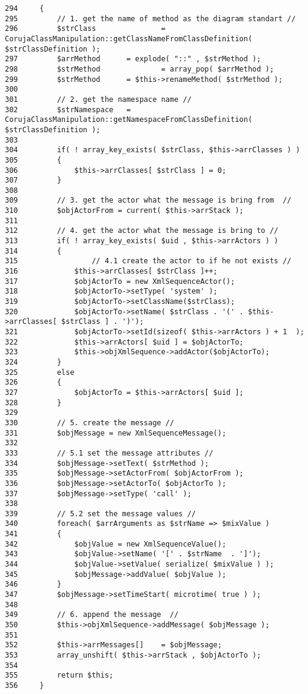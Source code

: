 \begin{Code}\begin{verbatim}294     {
295         // 1. get the name of method as the diagram standart //
296         $strClass               = CorujaClassManipulation::getClassNameFromClassDefinition( $strClassDefinition );
297         $arrMethod      = explode( "::" , $strMethod );
298         $strMethod              = array_pop( $arrMethod );
299         $strMethod      = $this->renameMethod( $strMethod );
300 
301         // 2. get the namespace name //
302         $strNamespace   = CorujaClassManipulation::getNamespaceFromClassDefinition( $strClassDefinition );
303 
304         if( ! array_key_exists( $strClass, $this->arrClasses ) )
305         {
306             $this->arrClasses[ $strClass ] = 0;
307         }
308 
309         // 3. get the actor what the message is bring from  //
310         $objActorFrom = current( $this->arrStack );
311 
312         // 4. get the actor what the message is bring to //
313         if( ! array_key_exists( $uid , $this->arrActors ) )
314         {
315                 // 4.1 create the actor to if he not exists //
316             $this->arrClasses[ $strClass ]++;
317             $objActorTo = new XmlSequenceActor();
318             $objActorTo->setType( 'system' );
319             $objActorTo->setClassName($strClass);
320             $objActorTo->setName( $strClass . '(' . $this->arrClasses[ $strClass ] . ')');
321             $objActorTo->setId(sizeof( $this->arrActors ) + 1  );
322             $this->arrActors[ $uid ] = $objActorTo;
323             $this->objXmlSequence->addActor($objActorTo);
324         }
325         else
326         {
327             $objActorTo = $this->arrActors[ $uid ];
328         }
329 
330         // 5. create the message //
331         $objMessage = new XmlSequenceMessage();
332 
333         // 5.1 set the message attributes //
334         $objMessage->setText( $strMethod );
335         $objMessage->setActorFrom( $objActorFrom );
336         $objMessage->setActorTo( $objActorTo );
337         $objMessage->setType( 'call' );
338         
339         // 5.2 set the message values //
340         foreach( $arrArguments as $strName => $mixValue )
341         {
342             $objValue = new XmlSequenceValue();
343             $objValue->setName( '[' . $strName  . ']');
344             $objValue->setValue( serialize( $mixValue ) );
345             $objMessage->addValue( $objValue );
346         }
347         $objMessage->setTimeStart( microtime( true ) );
348         
349         // 6. append the message  //
350         $this->objXmlSequence->addMessage( $objMessage );
351 
352         $this->arrMessages[]    = $objMessage;
353         array_unshift( $this->arrStack , $objActorTo );
354 
355         return $this;
356     }
\end{verbatim}
\end{Code}


